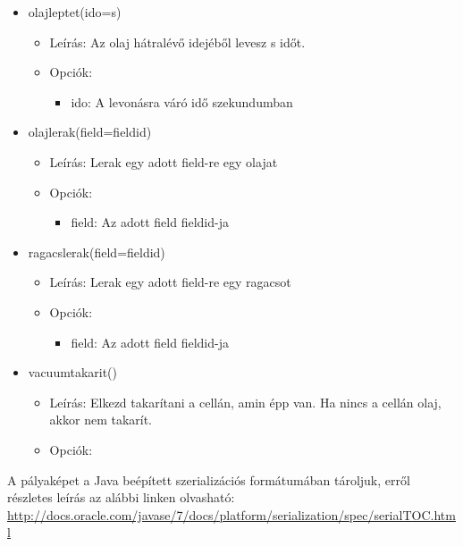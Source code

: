 \begin{itemize}
    \item olajleptet(ido=s)
    \begin{itemize}
    	\item Leírás: Az olaj hátralévő idejéből levesz s időt.
    	\item Opciók: 
    	\begin{itemize}
    		\item ido: A levonásra váró idő szekundumban
    	\end{itemize}	
    \end{itemize}
    
    \item olajlerak(field=fieldid)
    \begin{itemize}
       	\item Leírás: Lerak egy adott field-re egy olajat
       	\item Opciók: 
       	\begin{itemize}
       		\item field: Az adott field fieldid-ja
       	\end{itemize}	
    \end{itemize}
    
    \item ragacslerak(field=fieldid)
    \begin{itemize}
    	\item Leírás: Lerak egy adott field-re egy ragacsot
    	\item Opciók: 
    	\begin{itemize}
    		\item field: Az adott field fieldid-ja
    	\end{itemize}	
    \end{itemize}    
    
    \item vacuumtakarit()
    \begin{itemize}
    	\item Leírás: Elkezd takarítani a cellán, amin épp van. Ha nincs a cellán olaj, akkor nem takarít.
    	\item Opciók: 
    \end{itemize}    

    

\end{itemize}

\noindent A pályaképet a Java beépített szerializációs formátumában tároljuk, erről részletes leírás az alábbi linken olvasható:\\
\url{http://docs.oracle.com/javase/7/docs/platform/serialization/spec/serialTOC.html}

